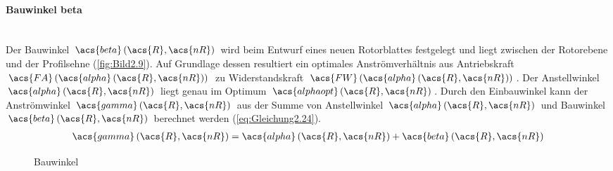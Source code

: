 \paragraph{Bauwinkel \acs{beta}}\mbox{}\smallskip\\
Der Bauwinkel $\acs{beta}\left(\acs{R}, \acs{nR}\right)$ wird beim Entwurf eines neuen Rotorblattes festgelegt und liegt zwischen der Rotorebene und der Profilsehne (\autoref{fig:Bild2.9}). Auf Grundlage dessen resultiert ein optimales Anströmverhältnis aus Antriebskraft $\acs{FA}\left(\acs{alpha}\left(\acs{R}, \acs{nR}\right)\right)$ zu Widerstandskraft $\acs{FW}\left(\acs{alpha}\left(\acs{R}, \acs{nR}\right)\right)$. Der Anstellwinkel $\acs{alpha}\left(\acs{R}, \acs{nR}\right)$ liegt genau im Optimum $\acs{alphaopt}\left(\acs{R}, \acs{nR}\right)$. Durch den Einbauwinkel kann der Anströmwinkel $\acs{gamma}\left(\acs{R}, \acs{nR}\right)$ aus der Summe von Anstellwinkel $\acs{alpha}\left(\acs{R}, \acs{nR}\right)$ und Bauwinkel $\acs{beta}\left(\acs{R}, \acs{nR}\right)$ berechnet werden (\autoref{eq:Gleichung2.24}).
\begin{align} \label{eq:Gleichung2.24}
	\acs{gamma}\left(\acs{R}, \acs{nR}\right) = \acs{alpha}\left(\acs{R}, \acs{nR}\right) + \acs{beta}\left(\acs{R}, \acs{nR}\right)
\end{align}
\begin{figure}[H]
   \centering
   \caption[Bauwinkel]{Bauwinkel \cite{SkriptSchulte}}
   \label{fig:Bild2.9}
\end{figure}

